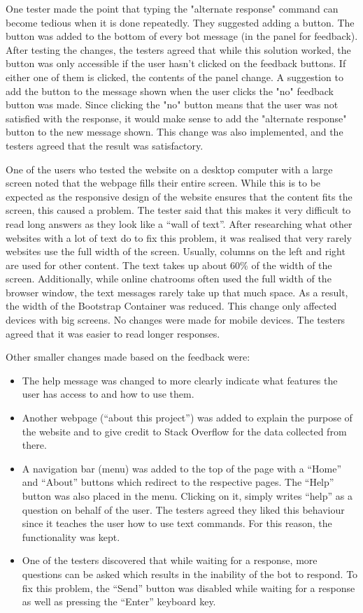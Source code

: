 \documentclass[12pt,a4paper]{article}
\begin{document}
One tester made the point that typing the "alternate response" command can become tedious when it is done repeatedly. They suggested adding a button. The button was added to the bottom of every bot message (in the panel for feedback). After testing the changes, the testers agreed that while this solution worked, the button was only accessible if the user hasn't clicked on the feedback buttons. If either one of them is clicked, the contents of the panel change. A suggestion to add the button to the message shown when the user clicks the "no" feedback button was made. Since clicking the "no" button means that the user was not satisfied with the response, it would make sense to add the "alternate response" button to the new message shown. This change was also implemented, and the testers agreed that the result was satisfactory.

One of the users who tested the website on a desktop computer with a large screen noted that the webpage fills their entire screen. While this is to be expected as the responsive design of the website ensures that the content fits the screen, this caused a problem. The tester said that this makes it very difficult to read long answers as they look like a “wall of text”. After researching what other websites with a lot of text do to fix this problem, it was realised that very rarely websites use the full width of the screen. Usually, columns on the left and right are used for other content. The text takes up about 60\% of the width of the screen. Additionally, while online chatrooms often used the full width of the browser window, the text messages rarely take up that much space. As a result, the width of the Bootstrap Container was reduced. This change only affected devices with big screens. No changes were made for mobile devices. The testers agreed that it was easier to read longer responses.

Other smaller changes made based on the feedback were:
\begin{itemize}
    \item The help message was changed to more clearly indicate what features the user has access to and how to use them.
    \item Another webpage (\enquote{about this project}) was added to explain the purpose of the website and to give credit to Stack Overflow for the data collected from there.
    \item A navigation bar (menu) was added to the top of the page with a \enquote{Home} and \enquote{About} buttons which redirect to the respective pages. The \enquote{Help} button was also placed in the menu. Clicking on it, simply writes \enquote{help} as a question on behalf of the user. The testers agreed they liked this behaviour since it teaches the user how to use text commands. For this reason, the functionality was kept.
    \item One of the testers discovered that while waiting for a response, more questions can be asked which results in the inability of the bot to respond. To fix this problem, the \enquote{Send} button was disabled while waiting for a response as well as pressing the \enquote{Enter} keyboard key. 
\end{itemize}
\end{document}
